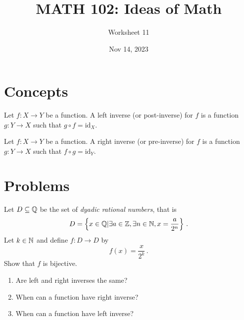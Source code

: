 \documentclass[12pt]{amsart}
\title{ MATH 102: Ideas  of Math }
\author{ Worksheet 11 }
\date{Nov 14, 2023}
\begin{document}
\maketitle

\section{Concepts}

\begin{definition}
    Let \( f: X \rightarrow Y \) be a function. A left inverse (or post-inverse) for \( f \) is a function \( g: Y \rightarrow X \) such that \( g \circ f = \text{id}_X \).
\end{definition}

\begin{definition}
    Let \( f: X \rightarrow Y \) be a function. A right inverse (or pre-inverse) for \( f \) is a function \( g: Y \rightarrow X \) such that \( f \circ g = \text{id}_Y \).
\end{definition}


\section{Problems}

\begin{problem}
    Let $D \subseteq \mathbb{Q}$ be the set of \emph{dyadic rational numbers}, that is
    \begin{equation*}
        D =\left\{x \in \mathbb{Q} | \exists a \in \mathbb{Z}, \exists n\in \mathbb{N}, x = \frac{a}{2^n} \right\} \,.
    \end{equation*}
    Let $k \in \mathbb{N}$ and define $f:D\to D$ by
    \begin{equation*}
        f(x) = \frac{x}{2^k} \,.
    \end{equation*}
    Show that $f$ is bijective.
\end{problem}

\begin{problem}
    \begin{enumerate}
        \item Are left and right inverses the same?
        \item When can a function have right inverse?
        \item When can a function have left inverse?
    \end{enumerate}



\end{problem}
\end{document}
